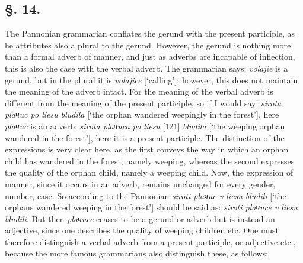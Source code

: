 \subsection*{\hspace*{\fill}§. 14.\hspace*{\fill}}

The Pannonian grammarian conflates the gerund with the present participle, as he attributes also a plural to the gerund. However, the gerund is nothing more than a formal adverb of manner, and just as adverbs are incapable of inflection, this is also the case with the verbal adverb. The grammarian says: \textit{volajie} is a gerund, but in the plural it is \textit{volajice} [‘calling’]; however, this does not maintain the meaning of the adverb intact. For the meaning of the verbal adverb is different from the meaning of the present participle, so if I would say: \textit{sirota plaчuc po liesu bludila} [‘the orphan wandered weepingly in the forest’], here \textit{plaчuc} is an adverb; \textit{sirota plaчuca po liesu} [121] \textit{bludila} [‘the weeping orphan wandered in the forest’], here it is a present participle. The distinction of the expressions is very clear here, as the first conveys the way in which an orphan child has wandered in the forest, namely weeping, whereas the second expresses the quality of the orphan child, namely a weeping child. Now, the expression of manner, since it occurs in an adverb, remains unchanged for every gender, number, case. So according to the Pannonian \textit{siroti plaчuc v liesu bludili} [‘the orphans wandered weeping in the forest’] should be said as: \textit{siroti plaчuce v liesu bludili}. But then \textit{plaчuce} ceases to be a gerund or adverb but is instead an adjective, since one describes the quality of weeping children etc. One must therefore distinguish a verbal adverb from a present participle, or adjective etc., because the more famous grammarians also distinguish these, as follows:

